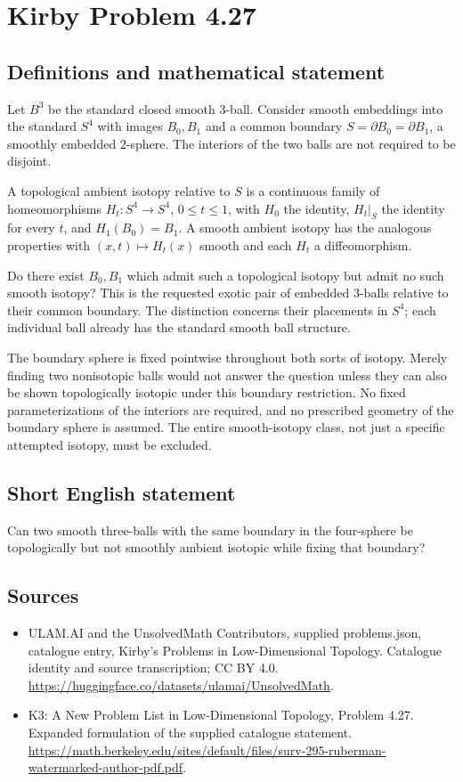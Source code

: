 \documentclass[11pt,a4paper]{article}
\begin{document}
\section*{Kirby Problem 4.27}\label{statement}

\subsection{Definitions and mathematical statement}
Let $B^3$ be the standard closed smooth $3$-ball. Consider smooth
embeddings into the standard $S^4$ with images $B_0,B_1$ and a
common boundary $S=\partial B_0=\partial B_1$, a smoothly embedded
$2$-sphere. The interiors of the two balls are not required to be
disjoint.

A topological ambient isotopy relative to $S$ is a continuous family
of homeomorphisms $H_t:S^4\to S^4$, $0\le t\le1$, with $H_0$
the identity, $H_t|_S$ the identity for every $t$, and $H_1(B_0)=B_1$.
A smooth ambient isotopy has the analogous properties with $(x,t)
\mapsto H_t(x)$ smooth and each $H_t$ a diffeomorphism.

Do there exist $B_0,B_1$ which admit such a topological isotopy but
admit no such smooth isotopy? This is the requested exotic pair of
embedded $3$-balls relative to their common boundary. The distinction
concerns their placements in $S^4$; each individual ball already has
the standard smooth ball structure.

The boundary sphere is fixed pointwise throughout both sorts of
isotopy. Merely finding two nonisotopic balls would not answer the
question unless they can also be shown topologically isotopic under
this boundary restriction. No fixed parameterizations of the interiors
are required, and no prescribed geometry of the boundary sphere is
assumed. The entire smooth-isotopy class, not just a specific attempted
isotopy, must be excluded.
\subsection{Short English statement}
Can two smooth three-balls with the same boundary in the four-sphere be topologically but not smoothly ambient isotopic while fixing that boundary?
\subsection{Sources}
\begin{itemize}
\item[S1] ULAM.AI and the UnsolvedMath Contributors, supplied problems.json, catalogue entry, Kirby's Problems in Low-Dimensional Topology. Catalogue identity and source transcription; CC BY 4.0.
\url{https://huggingface.co/datasets/ulamai/UnsolvedMath}.
\item[S2] K3: A New Problem List in Low-Dimensional Topology, Problem 4.27. Expanded formulation of the supplied catalogue statement.
\url{https://math.berkeley.edu/sites/default/files/surv-295-ruberman-watermarked-author-pdf.pdf}.
\end{itemize}
\end{document}
